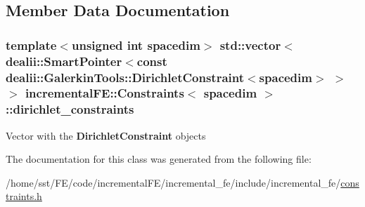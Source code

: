 \subsection{Member Data Documentation}
\subsubsection[{\texorpdfstring{dirichlet\+\_\+constraints}{dirichlet_constraints}}]{\setlength{\rightskip}{0pt plus 5cm}template$<$unsigned int spacedim$>$ std\+::vector$<$ dealii\+::\+Smart\+Pointer$<$const dealii\+::\+Galerkin\+Tools\+::\+Dirichlet\+Constraint$<$spacedim$>$ $>$ $>$ {\bf incremental\+F\+E\+::\+Constraints}$<$ spacedim $>$\+::dirichlet\+\_\+constraints\hspace{0.3cm}{\ttfamily [private]}}\hypertarget{classincremental_f_e_1_1_constraints_aaa6042a72b76026d58416affbf056688}{}\label{classincremental_f_e_1_1_constraints_aaa6042a72b76026d58416affbf056688}
Vector with the {\bf Dirichlet\+Constraint} objects 

The documentation for this class was generated from the following file\+:\begin{DoxyCompactItemize}
\item 
/home/sst/\+F\+E/code/incremental\+F\+E/incremental\+\_\+fe/include/incremental\+\_\+fe/\hyperlink{constraints_8h}{constraints.\+h}\end{DoxyCompactItemize}
